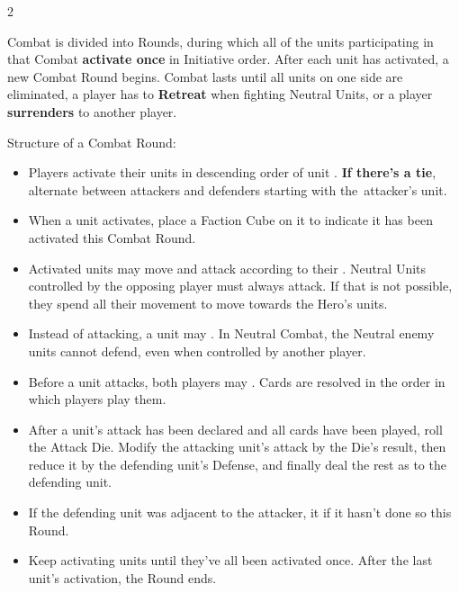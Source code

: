 \begin{multicols*}{2}

Combat is divided into Rounds, during which all of the units participating in that Combat \textbf{activate once} in Initiative order.
After each unit has activated, a new Combat Round begins.
Combat lasts until all units on one side are eliminated, a player has to \textbf{Retreat} when fighting Neutral Units, or a player \textbf{surrenders} to another player.

Structure of a Combat Round:
\begin{itemize}[leftmargin=2.3em]
  \item Players activate their units in descending order of unit . \textbf{If there's a tie}, alternate between attackers and defenders starting with the~attacker's unit.
  \item When a unit activates, place a Faction Cube on it to indicate it has been activated this Combat Round.
  \item Activated units may move and attack according to their .
    Neutral Units controlled by the opposing player must always attack. If that is not possible, they spend all their movement to move towards the Hero's units.
  \item Instead of attacking, a unit may .
  In Neutral Combat, the Neutral enemy units cannot defend, even when controlled by another player.
  \item Before a unit attacks, both players may . Cards are resolved in the order in which players play them.
  \item After a unit's attack has been declared and all cards have been played, roll the Attack Die.
    Modify the attacking unit's attack by the Die's result, then reduce it by the defending unit's Defense, and finally deal the rest as  to the defending unit.
  \item If the defending unit was adjacent to the attacker, it  if it hasn't done so this Round.
  \item Keep activating units until they've all been activated once.
After the last unit's activation, the Round ends.
\end{itemize}
\vspace*{\fill}


\end{multicols*}
